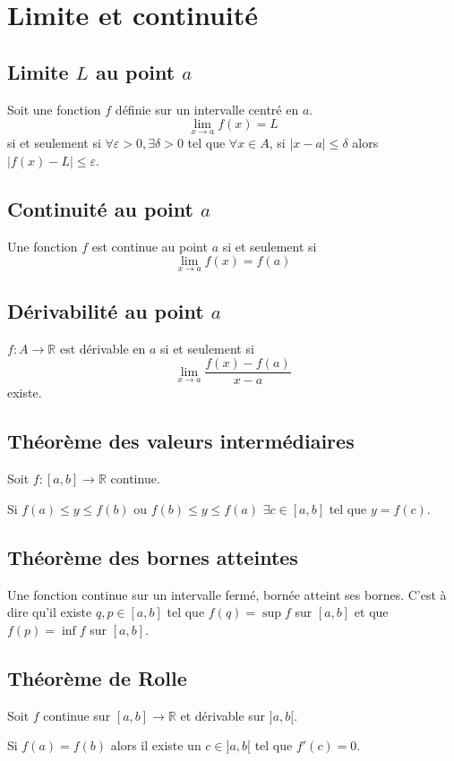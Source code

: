 \section{Limite et continuité}
\subsection{Limite $L$ au point $a$}
Soit une fonction $f$ définie sur un intervalle centré en $a$.
\[ \lim_{x \to a} f(x) = L \]
si et seulement si
$\forall \varepsilon > 0, \exists \delta > 0$ tel que
$\forall x \in A$, si $|x - a| \leq \delta$ alors
$|f(x) - L| \leq \varepsilon$.

\subsection{Continuité au point $a$}
Une fonction $f$ est continue au point $a$ si et seulement si
\[ \lim_{x \to a} f(x) = f(a) \]

\subsection{Dérivabilité au point $a$}
$f : A \to \mathbb{R}$ est dérivable en $a$ si et seulement si
\[ \lim_{x \to a} \frac{f(x) - f(a)}{x - a} \]
existe.

\subsection{Théorème des valeurs intermédiaires}
Soit $f : [a,b] \to \mathbb{R}$ continue.

Si $f(a) \leq y \leq f(b)$ ou $f(b) \leq y \leq f(a)$
$\exists c \in [a,b]$ tel que $y = f(c)$.

\subsection{Théorème des bornes atteintes}
Une fonction continue sur un intervalle fermé, bornée atteint ses bornes.
C'est à dire qu'il existe $q, p \in [a,b]$ tel que
$f(q) = \sup f$ sur $[a,b]$
et que $f(p) = \inf f$ sur $[a,b]$.

\subsection{Théorème de Rolle}
Soit $f$ continue sur $[a,b] \to \mathbb{R}$ et dérivable sur $]a,b[$.

Si $f(a) = f(b)$ alors il existe un $c \in ]a,b[$ tel que $f'(c) = 0$.

